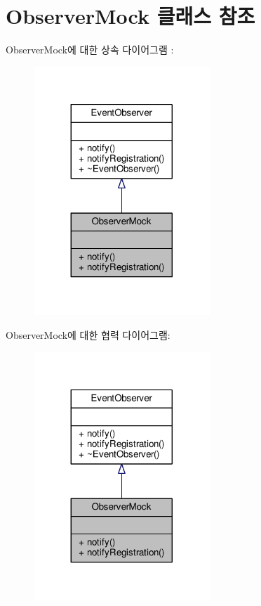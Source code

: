 \hypertarget{class_observer_mock}{}\section{Observer\+Mock 클래스 참조}
\label{class_observer_mock}


Observer\+Mock에 대한 상속 다이어그램 \+: 
\nopagebreak
\begin{figure}[H]
\begin{center}
\leavevmode
\includegraphics[width=188pt]{class_observer_mock__inherit__graph}
\end{center}
\end{figure}


Observer\+Mock에 대한 협력 다이어그램\+:
\nopagebreak
\begin{figure}[H]
\begin{center}
\leavevmode
\includegraphics[width=188pt]{class_observer_mock__coll__graph}
\end{center}
\end{figure}
